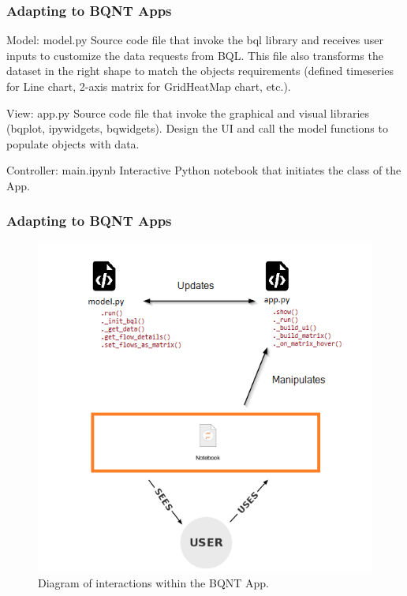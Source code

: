 \documentclass{beamer}
\begin{document}

\begin{frame}
\frametitle{Adapting to BQNT Apps}
\begin{block}{Model: model.py}
Source code file that invoke the bql library and receives user inputs to customize the data requests from BQL. This file also transforms the dataset in the right shape to match the objects requirements (defined timeseries for Line chart, 2-axis matrix for GridHeatMap chart, etc.).
\end{block}

\begin{block}{View: app.py}
Source code file that invoke the graphical and visual libraries (bqplot, ipywidgets, bqwidgets). Design the UI and call the model functions to populate objects with data.
\end{block}

\begin{block}{Controller: main.ipynb}
Interactive Python notebook that initiates the class of the App.
\end{block}
\end{frame}


\begin{frame}
\frametitle{Adapting to BQNT Apps}

\begin{figure}
    \includegraphics[width=0.7\columnwidth]{images/MVC-Process_BQNT.png}
    \caption{Diagram of interactions within the BQNT App.}
\end{figure}

\end{frame}
\end{document}
